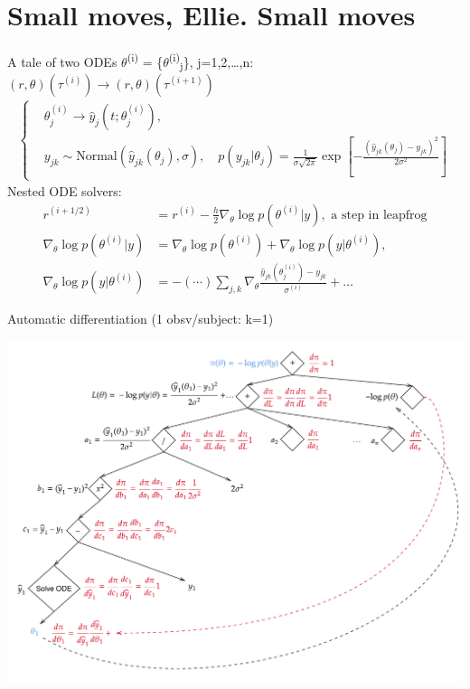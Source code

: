 \documentclass[bigger]{beamer}
\begin{document}
\section{Small moves, Ellie. Small moves}
\label{sec:org7d224d2}
\begin{frame}[label={sec:org066842c}]{A tale of two ODEs}
\(\theta\)\textsuperscript{(i)} = \{\(\theta\)\textsuperscript{(i)}\textsubscript{j}\}, j=1,2,\dots{},n: \((r, \theta)(\tau^{(i)}) \rightarrow (r, \theta)(\tau^{(i+1)})\)
\begin{align*}
\begin{cases}
  &\theta^{(i)}_j \rightarrow \hat{y}_j(t; \theta^{(i)}_j),\\
  &y_{jk} \sim \text{Normal}(\hat{y}_{jk}(\theta_j), \sigma),\quad p(y_{jk}|\theta_j) = \frac{1}{\sigma\sqrt{2\pi}}\exp{\left[-\frac{(\hat{y}_{jk}(\theta_j)-y_{jk})^2}{2\sigma^2}\right]}
\end{cases}
\end{align*}
Nested ODE solvers:
\begin{align*}
  r^{(i+1/2)} &= r^{(i)} - \frac{h}{2}\nabla_{\theta} \log{p(\theta^{(i)} | y)},\text{  a step in leapfrog}\\
  \nabla_{\theta} \log{p(\theta^{(i)} | y)} &= \nabla_{\theta} \log{p(\theta^{(i)})} + \nabla_{\theta} \log{p(y | \theta^{(i)})},\\
  \nabla_{\theta} \log{p(y | \theta^{(i)})} &= - (\cdots)\sum_{j,k}\nabla_{\theta} \frac{\hat{y}_{jk}(\theta_j^{(i)}) - y_{jk}}{\sigma^{(i)}} + \dots
\end{align*}
\end{frame}

\begin{frame}[label={sec:org7ca33d2}]{Automatic differentiation (1 obsv/subject: k=1)}
\begin{center}
\includegraphics[width=\textwidth]{./figure/autodiff_diag.pdf}
\end{center}
\end{frame}
\end{document}
